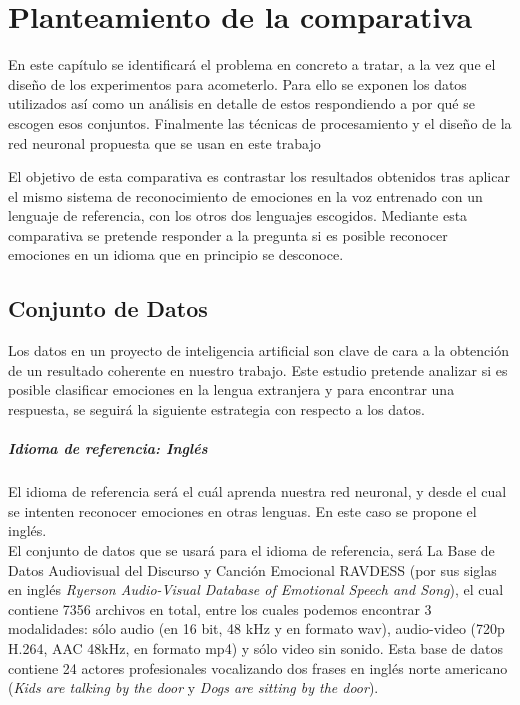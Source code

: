 \documentclass[11pt,a4paper,spanish]{book}
\begin{document}
	\chapter{Planteamiento de la comparativa}
	
	En este capítulo se identificará el problema en concreto a tratar, a la vez que el diseño de los experimentos para acometerlo. Para ello se exponen los datos utilizados así como un análisis en detalle de estos respondiendo a por qué se escogen esos conjuntos. Finalmente las técnicas de procesamiento y el diseño de la red neuronal propuesta que se usan en este trabajo
	
	El objetivo de esta comparativa es contrastar los resultados obtenidos tras aplicar el mismo sistema de reconocimiento de emociones en la voz entrenado con un lenguaje de referencia, con los otros dos lenguajes escogidos. Mediante esta comparativa se pretende responder a la pregunta si es posible reconocer emociones en un idioma que en principio se desconoce.
	
	\section{Conjunto de Datos}
	\label{lb_c4_datos}
	Los datos en un proyecto de inteligencia artificial son clave de cara a la obtención de un resultado coherente en nuestro trabajo. Este estudio pretende analizar si es posible clasificar emociones en la lengua extranjera y para encontrar una respuesta, se seguirá la siguiente estrategia con respecto a los datos.
	
	\paragraph{Idioma de referencia: Inglés} El idioma de referencia será el cuál aprenda nuestra red neuronal, y desde el cual se intenten reconocer emociones en otras lenguas. En este caso se propone el inglés.\\
	
	El conjunto de datos que se usará para el idioma de referencia, será La Base de Datos Audiovisual del Discurso y Canción Emocional RAVDESS (por sus siglas en inglés \emph{Ryerson Audio-Visual Database of Emotional Speech and Song}), el cual contiene 7356 archivos en total, entre los cuales podemos encontrar 3 modalidades: sólo audio (en 16 bit, 48 kHz y en formato wav), audio-video (720p H.264, AAC 48kHz, en formato mp4) y sólo video sin sonido. Esta base de datos contiene 24 actores profesionales vocalizando dos frases en inglés norte americano (\emph{Kids are talking by the door} y \emph{Dogs are sitting by the door}).
	
\end{document}
